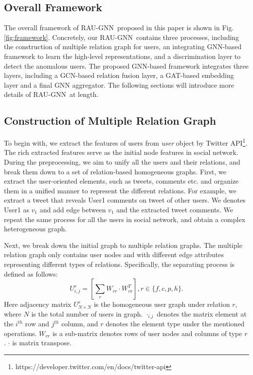 \documentclass[conference]{IEEEtran}
\theoremstyle{definition}
\newcommand{\model}{\textsc{RAU-GNN}}
\begin{document}
\subsection{Overall Framework}
The overall framework of \model~proposed in this paper is shown in Fig.\ref{fig:framework}. 
Concretely, our \model~contains three processes, including the construction of multiple relation graph for users, an integrating GNN-based framework to learn the high-level representations, and a discrimination layer to detect the anomalous users. The proposed GNN-based framework integrates three layers, including a GCN-based relation fusion layer, a GAT-based embedding layer and a final GNN aggregator.
The following sections will introduce more details of \model~at length.
\subsection{Construction of Multiple Relation Graph}
\label{sec:mrg}
To begin with, we extract the features of users from \textit{user} object by Twitter API\footnote{https://developer.twitter.com/en/docs/twitter-api}. The rich extracted features serve as the initial node features in social network. 
During the preprocessing, we aim to unify all the users and their relations, and break them down to a set of relation-based homogeneous graphs.
First, we extract the user-oriented elements, such as tweets, comments etc. and organize them in a unified manner to represent the different relations. 
For example, we extract a tweet that reveals User1 comments on tweet of other users. We denotes User1 as $v_1$ and add edge  between $v_1$ and the extracted tweet comments. We repeat the same process for all the users in social network, and obtain a complex heterogeneous graph.

Next, we break down the initial graph to multiple relation graphs. The multiple relation graph only contains user nodes and with different edge attributes representing different types of relations. Specifically, the separating process is defined as follows:
\begin{equation}
    U^r_{i, j} = \left[ \sum_r W_{vr} \cdot W_{vr}^T \right], r \in \{f, c, p, h\}.
\end{equation}
Here adjacency matrix $U^r_{N \times N}$ is the homogeneous user graph under relation $r$, where $N$ is the total number of users in graph. $\cdot_{i.j}$ denotes the matrix element at the $i^{th}$ row and $j^{th}$ column, and $r$ denotes the element type under the mentioned operations.  $W_{vr}$ is a sub-matrix denotes rows of user nodes and columns of type $r$. $\cdot$ is matrix transpose.
\end{document}
